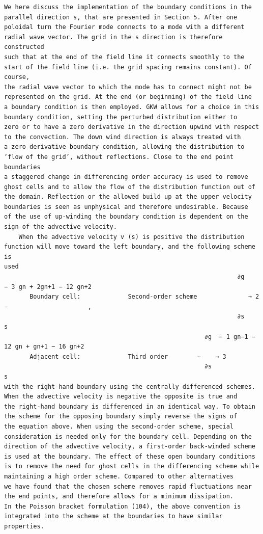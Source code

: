 \documentclass[a4paper]{article}
\newcommand{\gkwpagefont}{\fontsize{6.0pt}{7.55pt}\selectfont}
\begin{document}
\begin{Verbatim}[fontsize=\gkwpagefont]
    We here discuss the implementation of the boundary conditions in the parallel direction s, that are presented in Section 5. After one
poloidal turn the Fourier mode connects to a mode with a different radial wave vector. The grid in the s direction is therefore constructed
such that at the end of the field line it connects smoothly to the start of the field line (i.e. the grid spacing remains constant). Of course,
the radial wave vector to which the mode has to connect might not be represented on the grid. At the end (or beginning) of the field line
a boundary condition is then employed. GKW allows for a choice in this boundary condition, setting the perturbed distribution either to
zero or to have a zero derivative in the direction upwind with respect to the convection. The down wind direction is always treated with
a zero derivative boundary condition, allowing the distribution to ‘flow of the grid’, without reflections. Close to the end point boundaries
a staggered change in differencing order accuracy is used to remove ghost cells and to allow the flow of the distribution function out of
the domain. Reflection or the allowed build up at the upper velocity boundaries is seen as unphysical and therefore undesirable. Because
of the use of up-winding the boundary condition is dependent on the sign of the advective velocity.
    When the advective velocity v (s) is positive the distribution function will move toward the left boundary, and the following scheme is
used
                                                                ∂g    − 3 gn + 2gn+1 − 12 gn+2
       Boundary cell:             Second-order scheme              → 2  −                      ,
                                                                ∂s               s
                                                       ∂g  − 1 gn−1 − 12 gn + gn+1 − 16 gn+2
       Adjacent cell:             Third order        −    → 3
                                                       ∂s                  s
with the right-hand boundary using the centrally differenced schemes. When the advective velocity is negative the opposite is true and
the right-hand boundary is differenced in an identical way. To obtain the scheme for the opposing boundary simply reverse the signs of
the equation above. When using the second-order scheme, special consideration is needed only for the boundary cell. Depending on the
direction of the advective velocity, a first-order back-winded scheme is used at the boundary. The effect of these open boundary conditions
is to remove the need for ghost cells in the differencing scheme while maintaining a high order scheme. Compared to other alternatives
we have found that the chosen scheme removes rapid fluctuations near the end points, and therefore allows for a minimum dissipation.
In the Poisson bracket formulation (104), the above convention is integrated into the scheme at the boundaries to have similar properties.


\end{Verbatim}
\end{document}

